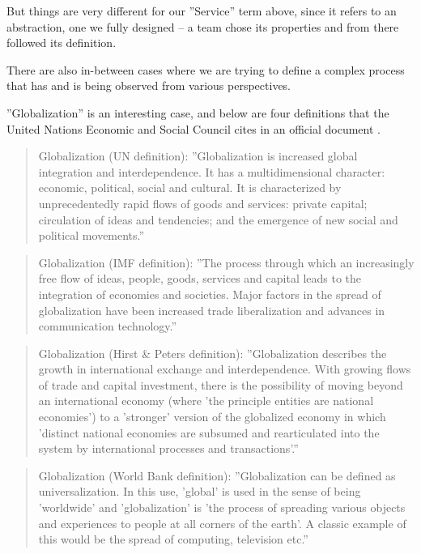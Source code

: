 \documentclass[graybox,envcountchap,sectrefs]{svmono}
\begin{document}
But things are very different for our ''Service'' term above, since it refers to an abstraction, one we fully designed -- a team chose its properties and from there followed its definition.

There are also in-between cases where we are trying to define a complex process that has and is being observed from various perspectives. 

''Globalization'' is an interesting case, and below are four definitions that the United Nations Economic and Social Council cites in an official document \cite{unesc-terminology}.

\begin{quote}
Globalization (UN definition): ''Globalization is increased global integration and interdependence. It has a multidimensional character: economic, political, social and cultural. It is characterized by unprecedentedly rapid flows of goods and services: private capital; circulation of ideas and tendencies; and the emergence of new social and political movements.''
\end{quote}

\begin{quote}
Globalization (IMF definition): ''The process through which an increasingly free flow of ideas, people, goods, services and capital leads to the integration of economies and societies. Major factors in the spread of globalization have been increased trade liberalization and advances in communication technology.''
\end{quote}

\begin{quote}
Globalization (Hirst \& Peters definition): ''Globalization describes the growth in international exchange and interdependence. With growing flows of trade and capital investment, there is the possibility of moving beyond an international economy (where 'the principle entities are national economies') to a 'stronger' version of the globalized economy in which 'distinct national economies are subsumed and rearticulated into the system by international processes and transactions'.''
\end{quote}

\begin{quote}
Globalization (World Bank definition): ''Globalization can be defined as universalization. In this use, 'global' is used in the sense of being 'worldwide' and 'globalization' is 'the process of spreading various objects and experiences to people at all corners of the earth'. A classic example of this would be the spread of computing, television etc.''
\end{quote}
\end{document}

